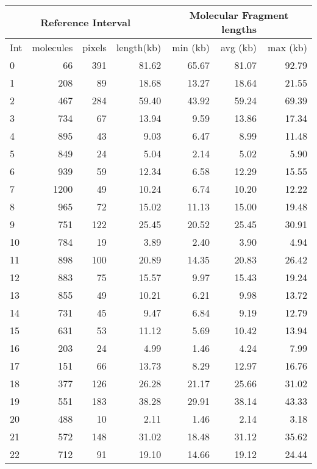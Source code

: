 \begin{table}[t]
\centering
\begin{tabular}{lrrr|rrr}
  \hline
  \hline
  \multicolumn{4}{c}{Reference Interval} & \multicolumn{3}{c}{Molecular Fragment lengths} \\
  \hline
   Int  & molecules & pixels & length(kb) & min (kb) & avg (kb) & max (kb)\\ 
  \hline
  \hline
    0 &  66 & 391 & 81.62 & 65.67 & 81.07 & 92.79 \\ 
    1 & 208 & 89 & 18.68 & 13.27 & 18.64 & 21.55 \\ 
    2 & 467 & 284 & 59.40 & 43.92 & 59.24 & 69.39 \\ 
    3 & 734 & 67 & 13.94 & 9.59 & 13.86 & 17.34 \\ 
    4 & 895 & 43 & 9.03 & 6.47 & 8.99 & 11.48 \\ 
    5 & 849 & 24 & 5.04 & 2.14 & 5.02 & 5.90 \\ 
    6 & 939 & 59 & 12.34 & 6.58 & 12.29 & 15.55 \\ 
    7 & 1200 & 49 & 10.24 & 6.74 & 10.20 & 12.22 \\ 
    8 & 965 & 72 & 15.02 & 11.13 & 15.00 & 19.48 \\ 
    9 & 751 & 122 & 25.45 & 20.52 & 25.45 & 30.91 \\ 
   10 & 784 & 19 & 3.89 & 2.40 & 3.90 & 4.94 \\ 
   11 & 898 & 100 & 20.89 & 14.35 & 20.83 & 26.42 \\ 
   12 & 883 & 75 & 15.57 & 9.97 & 15.43 & 19.24 \\ 
   13 & 855 & 49 & 10.21 & 6.21 & 9.98 & 13.72 \\ 
   14 & 731 & 45 & 9.47 & 6.84 & 9.19 & 12.79 \\ 
   15 & 631 & 53 & 11.12 & 5.69 & 10.42 & 13.94 \\ 
   16 & 203 & 24 & 4.99 & 1.46 & 4.24 & 7.99 \\ 
   17 & 151 & 66 & 13.73 & 8.29 & 12.97 & 16.76 \\ 
   18 & 377 & 126 & 26.28 & 21.17 & 25.66 & 31.02 \\ 
   19 & 551 & 183 & 38.28 & 29.91 & 38.14 & 43.33 \\ 
   20 & 488 & 10 & 2.11 & 1.46 & 2.14 & 3.18 \\ 
   21 & 572 & 148 & 31.02 & 18.48 & 31.12 & 35.62 \\ 
   22 & 712 & 91 & 19.10 & 14.66 & 19.12 & 24.44 \\ 

\end{tabular}
\end{table}

